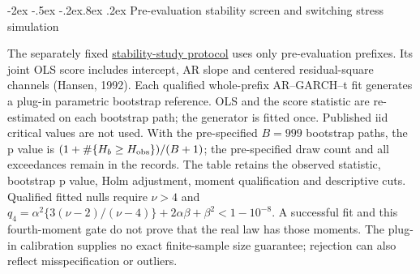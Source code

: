 \documentclass[10pt,a4paper]{article}
\makeatletter
\renewcommand\section{\@startsection{section}{1}{\z@}%
  {-2ex \@plus -.5ex \@minus -.2ex}{.8ex \@plus .2ex}%
  {\normalfont\large\bfseries}}
\makeatother
\begin{document}
\section{Pre-evaluation stability screen and switching stress simulation}\label{sup:v9-stability}

The separately fixed
\href{https://github.com/ByronLi0207/financial-mathematics-paper-20261020/blob/revision-v9/protocol/v9/nonstationarity-design.md}{stability-study protocol}
uses only pre-evaluation prefixes. Its joint OLS score includes intercept,
AR slope and centered residual-square channels (Hansen, 1992).
Each qualified whole-prefix AR--GARCH--t fit generates a plug-in parametric
bootstrap reference. OLS and the score statistic are re-estimated on each
bootstrap path; the generator is fitted once. Published iid critical values
are not used. With the pre-specified \(B=999\) bootstrap paths, the p value is
\((1+\#\{H_b\ge H_{\rm obs}\})/(B+1)\); the pre-specified draw count and
all exceedances remain in the records. The table retains the observed statistic,
bootstrap p value, Holm adjustment, moment qualification and descriptive cuts.
Qualified fitted nulls require \(\nu>4\) and
\(q_4=\alpha^2\{3(\nu-2)/(\nu-4)\}+2\alpha\beta+\beta^2<1-10^{-8}\).
A successful fit and this fourth-moment gate do not prove that the real law
has those moments. The plug-in calibration supplies no exact finite-sample
size guarantee; rejection can also reflect misspecification or outliers.
\end{document}
